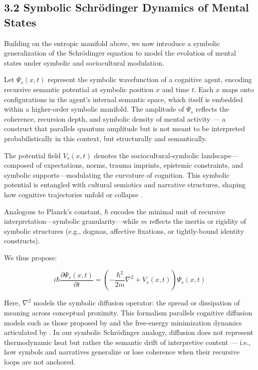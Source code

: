 \subsection*{3.2 Symbolic Schrödinger Dynamics of Mental States}

Building on the entropic manifold above, we now introduce a symbolic generalization of the Schrödinger equation to model the evolution of mental states under symbolic and sociocultural modulation.

Let \( \Psi_s(x, t) \) represent the symbolic wavefunction of a cognitive agent, encoding recursive semantic potential at symbolic position \( x \) and time \( t \). Each \( x \) maps onto configurations in the agent's internal semantic space, which itself is embedded within a higher-order symbolic manifold. The amplitude of \( \Psi_s \) reflects the coherence, recursion depth, and symbolic density of mental activity — a construct that parallels quantum amplitude but is not meant to be interpreted probabilistically in this context, but structurally and semantically.

The potential field \( V_s(x, t) \) denotes the sociocultural-symbolic landscape—composed of expectations, norms, trauma imprints, epistemic constraints, and symbolic supports—modulating the curvature of cognition. This symbolic potential is entangled with cultural semiotics and narrative structures, shaping how cognitive trajectories unfold or collapse \cite{lotman1990, deacon2011}.

Analogous to Planck’s constant, \( \hbar \) encodes the minimal unit of recursive interpretation—symbolic granularity—while \( m \) reflects the inertia or rigidity of symbolic structures (e.g., dogmas, affective fixations, or tightly-bound identity constructs).

We thus propose:

\[
i\hbar \frac{\partial \Psi_s(x, t)}{\partial t} = \left( -\frac{\hbar^2}{2m} \nabla^2 + V_s(x, t) \right) \Psi_s(x, t)
\]

Here, \( \nabla^2 \) models the symbolic diffusion operator: the spread or dissipation of meaning across conceptual proximity. This formalism parallels cognitive diffusion models such as those proposed by \cite{busemeyer2012} and the free-energy minimization dynamics articulated by \cite{friston2010}. In our symbolic Schrödinger analogy, diffusion does not represent thermodynamic heat but rather the semantic drift of interpretive content — i.e., how symbols and narratives generalize or lose coherence when their recursive loops are not anchored.


